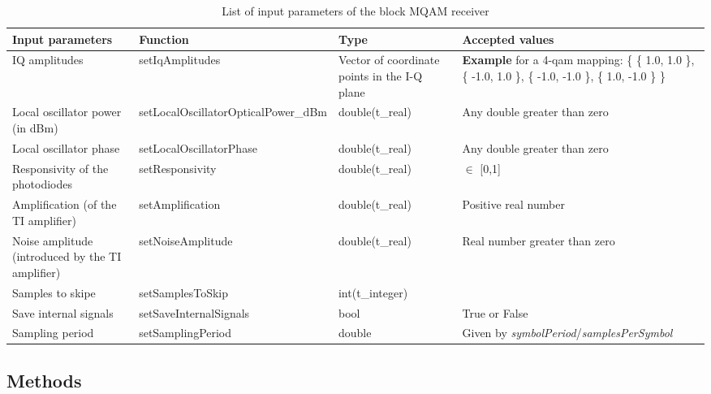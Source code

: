 \begin{table}[h]
	\begin{center}
		\begin{tabular}{| m{} | m{6cm} |  m{2cm} | m{4cm} | }
			\hline
			\textbf{Input parameters} & \textbf{Function} & \textbf{Type} & \textbf{Accepted values} \\ \hline
			IQ amplitudes & setIqAmplitudes & Vector of coordinate points in the I-Q plane & \textbf{Example} for a 4-qam mapping: \{ \{ 1.0, 1.0 \}, \{ -1.0, 1.0 \}, \{ -1.0, -1.0 \}, \{ 1.0, -1.0 \} \} \\ \hline
			Local oscillator power (in dBm) & setLocalOscillatorOpticalPower\_dBm & double(t\_real) & Any double greater than zero\\ \hline
			Local oscillator phase & setLocalOscillatorPhase & double(t\_real) & Any double greater than zero\\ \hline
			Responsivity of the photodiodes & setResponsivity & double(t\_real) &$\in$ [0,1] \\ \hline
			Amplification (of the TI amplifier) & setAmplification & double(t\_real) & Positive real number\\ \hline
			Noise amplitude (introduced by the TI amplifier) & setNoiseAmplitude & double(t\_real) & Real number greater than zero \\ \hline
			Samples to skipe & setSamplesToSkip & int(t\_integer) &  \\ \hline
			Save internal signals & setSaveInternalSignals & bool & True or False\\ \hline
			Sampling period & setSamplingPeriod & double & Given by \textit{symbolPeriod}/\textit{samplesPerSymbol}\\
			\hline
		\end{tabular}
		\caption{List of input parameters of the block MQAM receiver} \label{table}
	\end{center}
\end{table}

\pagebreak

\subsection*{Methods}

